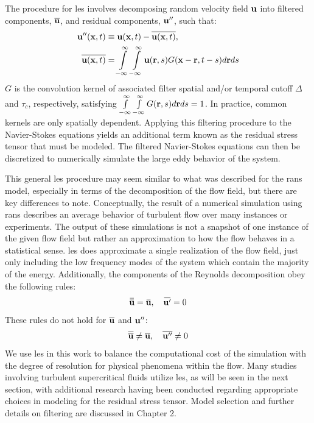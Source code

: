 The procedure for \gls{les} involves decomposing random velocity field $\vb{u}$ into filtered components, $\overline{\vb{u}}$, and residual components, $\vb{u}''$, such that: 
\begin{equation} \label{les_filtering}
\begin{aligned}
\vb{u}''(\vb{x},t) & \equiv \vb{u}(\vb{x}, t) - \overline{\vb{u}(\vb{x}, t)}, \\
\overline{\vb{u}(\vb{x},t)} & =  \int\limits_{-\infty}^{\infty}\int\limits_{-\infty}^{\infty} \vb{u}(\vb{r},s)G(\vb{x-r}, t-s) d\vb{r}ds
\end{aligned}
\end{equation}
$G$ is the convolution kernel of associated filter spatial and/or temporal cutoff $\Delta$ and $\tau_c$, respectively, satisfying $\int\limits_{-\infty}^{\infty}\int\limits_{-\infty}^{\infty}G(\vb{r}, s) d\vb{r}ds = 1$. In practice, common kernels are only spatially dependent. Applying this filtering procedure to the Navier-Stokes equations yields an additional term known as the residual stress tensor that must be modeled. The filtered Navier-Stokes equations can then be discretized to numerically simulate the large eddy behavior of the system.

This general \gls{les} procedure may seem similar to what was described for the \gls{rans} model, especially in terms of the decomposition of the flow field, but there are key differences to note. Conceptually, the result of a numerical simulation using \gls{rans} describes an average behavior of turbulent flow over many instances or experiments. The output of these simulations is not a snapshot of one instance of the given flow field but rather an approximation to how the flow behaves in a statistical sense. \gls{les} does approximate a single realization of the flow field, just only including the low frequency modes of the system which contain the majority of the energy. Additionally, the components of the Reynolds decomposition obey the following rules:
\begin{equation*}
\overbar{\overbar{\vb{u}}} = \overbar{\vb{u}}, \quad
\overbar{\vb{u}'} = 0
\end{equation*}
These rules do not hold for $\overline{\vb{u}}$ and $\vb{u}''$:
\begin{equation*}
\overline{\overline{\vb{u}}} \neq \overline{\vb{u}}, \quad
\overline{\vb{u}''} \neq 0
\end{equation*}
We use \gls{les} in this work to balance the computational cost of the simulation with the degree of resolution for physical phenomena within the flow. Many studies involving turbulent supercritical fluids utilize \gls{les}, as will be seen in the next section, with additional research having been conducted regarding appropriate choices in modeling for the residual stress tensor. Model selection and further details on filtering are discussed in Chapter 2. 

